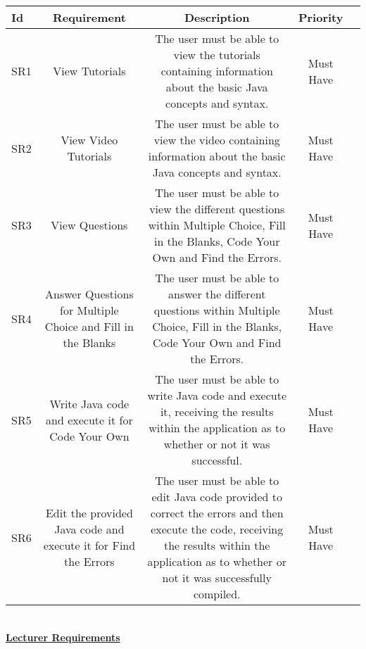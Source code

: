 \documentclass{article}
\begin{document}
\begin{tabular}{l*{3}{c}r}
\hline
\textbf{Id} & \textbf{Requirement} & \textbf{Description} & \textbf{Priority}\\
\hline
SR1 & \multicolumn{1}{m{4cm}}{View Tutorials} & \multicolumn{1}{m{8cm}}{The user must be able to view the tutorials containing information about the basic Java concepts and syntax.} & Must Have\\
SR2 & \multicolumn{1}{m{4cm}}{View Video Tutorials} & \multicolumn{1}{m{8cm}}{The user must be able to view the video containing information about the basic Java concepts and syntax.} & Must Have\\
SR3 & \multicolumn{1}{m{4cm}}{View Questions} & \multicolumn{1}{m{8cm}}{The user must be able to view the different questions within Multiple Choice, Fill in the Blanks, Code Your Own and Find the Errors.} & Must Have\\
SR4 & \multicolumn{1}{m{4cm}}{Answer Questions for Multiple Choice and Fill in the Blanks} & \multicolumn{1}{m{8cm}}{The user must be able to answer the different questions within Multiple Choice, Fill in the Blanks, Code Your Own and Find the Errors.} & Must Have\\
SR5 & \multicolumn{1}{m{4cm}}{Write Java code and execute it for Code Your Own} & \multicolumn{1}{m{8cm}}{The user must be able to write Java code and execute it, receiving the results within the application as to whether or not it was successful. }& Must Have \\
SR6 & \multicolumn{1}{m{4cm}}{Edit the provided Java code and execute it for Find the Errors} & \multicolumn{1}{m{8cm}}{The user must be able to edit Java code provided to correct the errors and then execute the code, receiving the results within the application as to whether or not it was successfully compiled. } & Must Have \\
\hline 
\end{tabular}\\
\newline
\newline
\textbf{\underline{Lecturer Requirements}}\\
\newline
\newline
\end{document}
